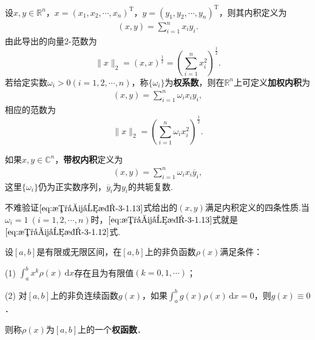 \documentclass[../../main.tex]{subfiles}%
\begin{document}
\begin{definition}
设\( x,y \in \mathbb{R}^n \)，\( x=(x_1,x_2,\cdots,x_n)^{\mathrm{T}} \)，\( y=(y_1,y_2,\cdots,y_n)^{\mathrm{T}} \)，则其内积定义为
\begin{align}
(x,y)=\sum_{i=1}^n x_i y_i. \label{eq:数值分析-3-1.12}
\end{align}
由此导出的向量2-范数为
\[
\|x\|_2=(x,x)^{\frac{1}{2}}=\left( \sum_{i=1}^n x_i^2 \right)^{\frac{1}{2}}.
\]
若给定实数\( \omega_i>0(i=1,2,\cdots,n) \)，称\( \{\omega_i\} \)为\textbf{权系数}，则在\( \mathbb{R}^n \)上可定义\textbf{加权内积}为
\begin{align}
(x,y)=\sum_{i=1}^n \omega_i x_i y_i, \label{eq:数值分析-3-1.13}
\end{align}
相应的范数为
\[
\|x\|_2=\left( \sum_{i=1}^n \omega_i x_i^2 \right)^{\frac{1}{2}}.
\]

如果\( x,y \in \mathbb{C}^n \)，\textbf{带权内积}定义为
\begin{align}
(x,y)=\sum_{i=1}^n \omega_i x_i \overline{y}_i, \label{eq:数值分析-3-1.14}
\end{align}
这里\( \{\omega_i\} \)仍为正实数序列，\( \overline{y}_i \)为\( y_i \)的共轭复数.
\end{definition}
\begin{remark}
不难验证\(\eqref{eq:数值分析-3-1.13}\)式给出的\( (x,y) \)满足内积定义的四条性质.当\( \omega_i=1 \ (i=1,2,\cdots,n) \)时，\(\eqref{eq:数值分析-3-1.13}\)式就是\(\eqref{eq:数值分析-3-1.12}\)式.
\end{remark}

\begin{definition}[权函数]
设\([a,b]\)是有限或无限区间，在\([a,b]\)上的非负函数\(\rho(x)\)满足条件：

(1) \(\int_a^b x^k \rho(x) \, \mathrm{d}x\)存在且为有限值\((k=0,1,\cdots)\)；

(2) 对\([a,b]\)上的非负连续函数\(g(x)\)，如果\(\int_a^b g(x) \rho(x) \, \mathrm{d}x = 0\)，则\(g(x) \equiv 0\)．

则称\(\rho(x)\)为\([a,b]\)上的一个\textbf{权函数}．
\end{definition}
\end{document}
